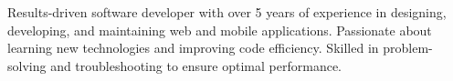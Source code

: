 \hspace{0.2in}Results-driven software developer with over 5 years of experience in designing,
developing, and maintaining web and mobile applications.
Passionate about learning new technologies and improving code efficiency.
Skilled in problem-solving and troubleshooting to ensure optimal performance.
